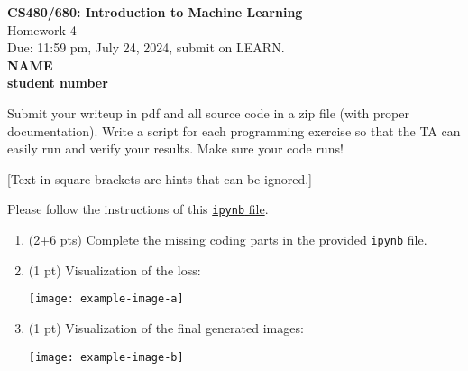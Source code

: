 \documentclass[10pt]{article}
\newcommand{\red}[1]{{\color{red}#1}}
\newcommand{\green}[1]{{\color{green}#1}}
\begin{document}
	
	\begin{center}
		\large{\textbf{CS480/680: Introduction to Machine Learning} \\ Homework 4\\ \red{Due: 11:59 pm, July 24, 2024}, \red{submit on LEARN}.} \\
		
		{\bf \green{NAME}} \\
		{\bf \green{student number}}
		
	\end{center}
	
	\begin{center}
		Submit your writeup in pdf and all source code in a zip file (with proper documentation). Write a script for each programming exercise so that the TA can easily run and verify your results. Make sure your code runs!
		
		[Text in square brackets are hints that can be ignored.]
	\end{center}

	\begin{exercise}
		Please follow the instructions of this \href{https://cs.uwaterloo.ca/~y328yu/mycourses/480/a4-wgan.ipynb}{\texttt{ipynb} file}. 

		\begin{enumerate}
		\item (2+6 pts) Complete the missing coding parts in the provided \href{https://cs.uwaterloo.ca/~y328yu/mycourses/480/a4-wgan.ipynb}{\texttt{ipynb} file}.

		\item (1 pt) Visualization of the loss: 

		\texttt{[image: example-image-a]}
		
		\item (1 pt) Visualization of the final generated images:

		\texttt{[image: example-image-b]}
		\end{enumerate}
	\end{exercise}
\end{document}
